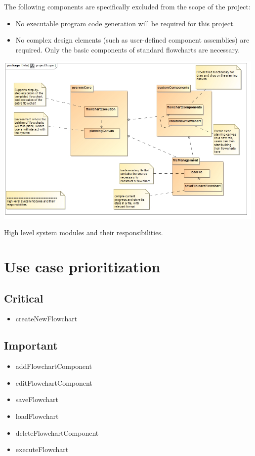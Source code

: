 \documentclass[11pt,a4paper,titlepage]{article}
\begin{document}
The following components are specifically excluded from the scope of the project:

\begin{itemize}
\item No executable program code generation will be required for this project.
\item No complex design elements (such as user-defined component assemblies) are required.
Only the basic components of standard flowcharts are necessary.\\

\end{itemize}

\includegraphics[width=500px]{projectScope.jpg}
\centerline{High level system modules and their responsibilities.}


\newpage	
\section{Use case prioritization}
\subsection{Critical}
\begin{itemize}
  \item createNewFlowchart
\end{itemize}
\subsection{Important}
\begin{itemize}
  \item addFlowchartComponent
  \item editFlowchartComponent
  \item saveFlowchart
  \item loadFlowchart
  \item deleteFlowchartComponent
  \item executeFlowchart
\end{itemize}
\end{document}
